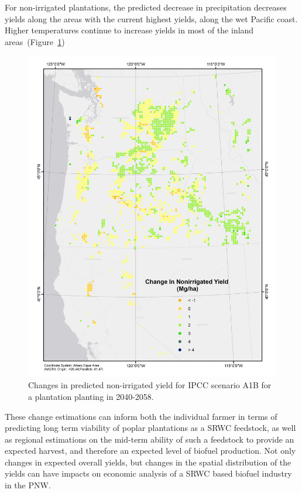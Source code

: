 \documentclass[preprint,12pt]{elsarticle}
\begin{document}
For non-irrigated plantations, the predicted decrease in precipitation
decreases yields along the areas with the current highest yields,
along the wet Pacific coast.  Higher temperatures continue to increase
yields in most of the inland areas~(Figure~\ref{fig:new_nonirrigated})

\begin{figure}[hp]
  \centering
  \includegraphics[width=1\linewidth]{climate_nonirrigated}
  \caption{Changes in predicted non-irrigated yield for \ac{IPCC} scenario A1B
    for a plantation planting in 2040-2058.}
  \label{fig:new_nonirrigated}
\end{figure}

These change estimations can inform both the individual farmer in terms of
predicting long term viability of poplar plantations as a \ac{SRWC}
feedstock, as well as regional estimations on the mid-term ability of
such a feedstock to provide an expected harvest, and therefore an
expected level of biofuel production.  Not only changes in expected
overall yields, but changes in the spatial distribution of the yields
can have impacts on economic analysis of a \ac{SRWC} based biofuel
industry in the \ac{PNW}.  
\end{document}

